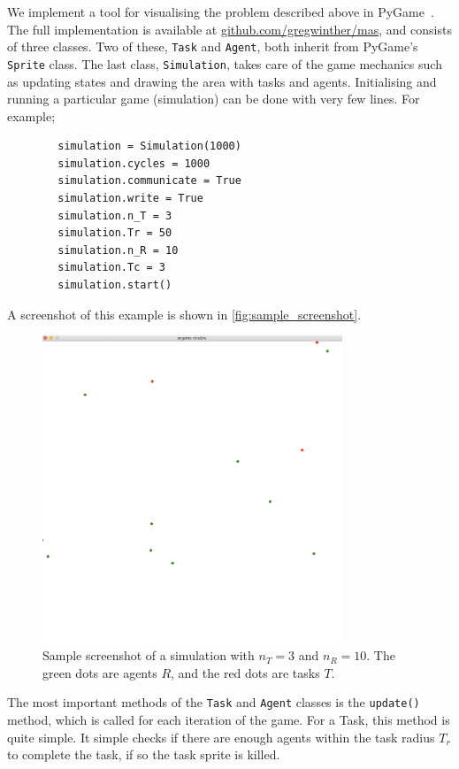 \documentclass[11pt]{article}
\begin{document}
    We implement a tool for visualising the problem described above in 
    PyGame~\cite{pygame}.
    The full implementation is available at \url{github.com/gregwinther/mas},
    and consists of three classes. Two of these, \lstinline!Task! and \lstinline!Agent!,
    both inherit from PyGame's \lstinline!Sprite! class. The last class,
    \lstinline!Simulation!, takes care of the game mechanics such as updating
    states and drawing the area with tasks and agents. Initialising and running 
    a particular game (simulation) can be done with very few lines. For example;
    \begin{lstlisting}
        simulation = Simulation(1000)
        simulation.cycles = 1000
        simulation.communicate = True
        simulation.write = True
        simulation.n_T = 3
        simulation.Tr = 50
        simulation.n_R = 10
        simulation.Tc = 3
        simulation.start()
    \end{lstlisting}
    A screenshot of this example is shown in \autoref{fig:sample_screenshot}.

    \begin{figure}
        \centering
        \includegraphics[width=0.8\textwidth]{figures/screenshot.png}
        \caption{\label{fig:sample_screenshot}
            Sample screenshot of a simulation with $n_T=3$ and $n_R=10$.
            The green dots are agents $R$, and the red 
            dots are tasks $T$. 
        }
    \end{figure}

    The most important methods of the \lstinline!Task! and \lstinline!Agent!
    classes is the \lstinline!update()! method, which is called for 
    each iteration of the game. For a Task, this method is 
    quite simple. It simple checks if there are enough agents within the 
    task radius $T_r$ to complete the task, if so the task sprite is killed.
    
\end{document}
